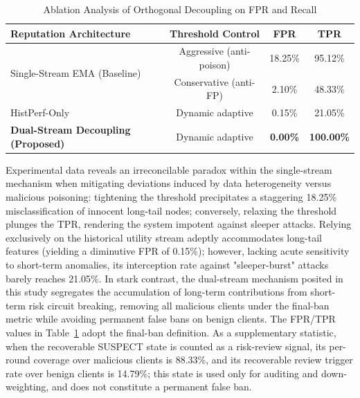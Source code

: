 \documentclass[11pt, a4paper]{article}
\begin{document}
\begin{table}[htbp]
    \centering
    \caption{Ablation Analysis of Orthogonal Decoupling on FPR and Recall}
    \label{tab:ablation_stream}
    \begin{tabular}{l c c c}
        \toprule
        \textbf{Reputation Architecture}              & \textbf{Threshold Control} & \textbf{FPR}    & \textbf{TPR}      \\
        \midrule
        \multirow{2}{*}{Single-Stream EMA (Baseline)} & Aggressive (anti-poison)   & 18.25\%         & 95.12\%           \\
                                                      & Conservative (anti-FP)     & 2.10\%          & 48.33\%           \\
        \midrule
        HistPerf-Only                                 & Dynamic adaptive           & 0.15\%          & 21.05\%           \\
        \textbf{Dual-Stream Decoupling (Proposed)}    & Dynamic adaptive           & \textbf{0.00\%} & \textbf{100.00\%} \\
        \bottomrule
    \end{tabular}
\end{table}

Experimental data reveals an irreconcilable paradox within the single-stream mechanism when mitigating deviations induced by data heterogeneity versus malicious poisoning: tightening the threshold precipitates a staggering 18.25\% misclassification of innocent long-tail nodes; conversely, relaxing the threshold plunges the TPR, rendering the system impotent against sleeper attacks. Relying exclusively on the historical utility stream adeptly accommodates long-tail features (yielding a diminutive FPR of 0.15\%); however, lacking acute sensitivity to short-term anomalies, its interception rate against "sleeper-burst" attacks barely reaches 21.05\%. In stark contrast, the dual-stream mechanism posited in this study segregates the accumulation of long-term contributions from short-term risk circuit breaking, removing all malicious clients under the final-ban metric while avoiding permanent false bans on benign clients. The FPR/TPR values in Table~\ref{tab:ablation_stream} adopt the final-ban definition. As a supplementary statistic, when the recoverable SUSPECT state is counted as a risk-review signal, its per-round coverage over malicious clients is 88.33\%, and its recoverable review trigger rate over benign clients is 14.79\%; this state is used only for auditing and down-weighting, and does not constitute a permanent false ban.
\end{document}
